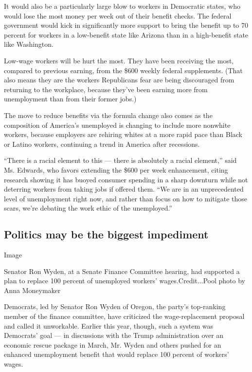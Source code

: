 It would also be a particularly large blow to workers in Democratic
states, who would lose the most money per week out of their benefit
checks. The federal government would kick in significantly more support
to bring the benefit up to 70 percent for workers in a low-benefit state
like Arizona than in a high-benefit state like Washington.

Low-wage workers will be hurt the most. They have been receiving the
most, compared to previous earning, from the \$600 weekly federal
supplements. (That also means they are the workers Republicans fear are
being discouraged from returning to the workplace, because they've been
earning more from unemployment than from their former jobs.)

The move to reduce benefits via the formula change also comes as the
composition of America's unemployed is changing to include more nonwhite
workers, because employers are rehiring whites at a more rapid pace than
Black or Latino workers, continuing a trend in America after recessions.

``There is a racial element to this --- there is absolutely a racial
element,'' said Ms. Edwards, who favors extending the \$600 per week
enhancement, citing research showing it has buoyed consumer spending in
a sharp downturn while not deterring workers from taking jobs if offered
them. ``We are in an unprecedented level of unemployment right now, and
rather than focus on how to mitigate those scars, we're debating the
work ethic of the unemployed.''

\hypertarget{politics-may-be-the-biggest-impediment}{%
\subsection{Politics may be the biggest
impediment}\label{politics-may-be-the-biggest-impediment}}

Image

Senator Ron Wyden, at a Senate Finance Committee hearing, had supported
a plan to replace 100 percent of unemployed workers' wages.Credit...Pool
photo by Anna Moneymaker

Democrats, led by Senator Ron Wyden of Oregon, the party's top-ranking
member of the finance committee, have criticized the wage-replacement
proposal and called it unworkable. Earlier this year, though, such a
system was Democrats' goal --- in discussions with the Trump
administration over an economic rescue package in March, Mr. Wyden and
others pushed for an enhanced unemployment benefit that would replace
100 percent of workers' wages.

